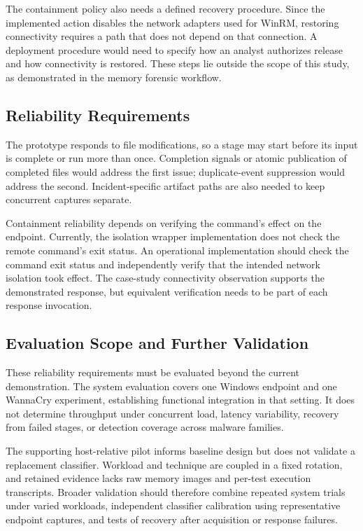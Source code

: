 \documentclass[conference]{IEEEtran}
\begin{document}
The containment policy also needs a defined recovery procedure. Since the implemented action disables the network adapters used for WinRM, restoring connectivity requires a path that does not depend on that connection. A deployment procedure would need to specify how an analyst authorizes release and how connectivity is restored. These steps lie outside the scope of this study, as demonstrated in the memory forensic workflow.

\subsection{Reliability Requirements}
The prototype responds to file modifications, so a stage may start before its input is complete or run more than once. Completion signals or atomic publication of completed files would address the first issue; duplicate-event suppression would address the second. Incident-specific artifact paths are also needed to keep concurrent captures separate.

Containment reliability depends on verifying the command's effect on the endpoint. Currently, the isolation wrapper implementation does not check the remote command's exit status. An operational implementation should check the command exit status and independently verify that the intended network isolation took effect. The case-study connectivity observation supports the demonstrated response, but equivalent verification needs to be part of each response invocation.

\subsection{Evaluation Scope and Further Validation}
These reliability requirements must be evaluated beyond the current demonstration. The system evaluation covers one Windows endpoint and one WannaCry experiment, establishing functional integration in that setting. It does not determine throughput under concurrent load, latency variability, recovery from failed stages, or detection coverage across malware families.

The supporting host-relative pilot informs baseline design but does not validate a replacement classifier. Workload and technique are coupled in a fixed rotation, and retained evidence lacks raw memory images and per-test execution transcripts. Broader validation should therefore combine repeated system trials under varied workloads, independent classifier calibration using representative endpoint captures, and tests of recovery after acquisition or response failures.
\end{document}
